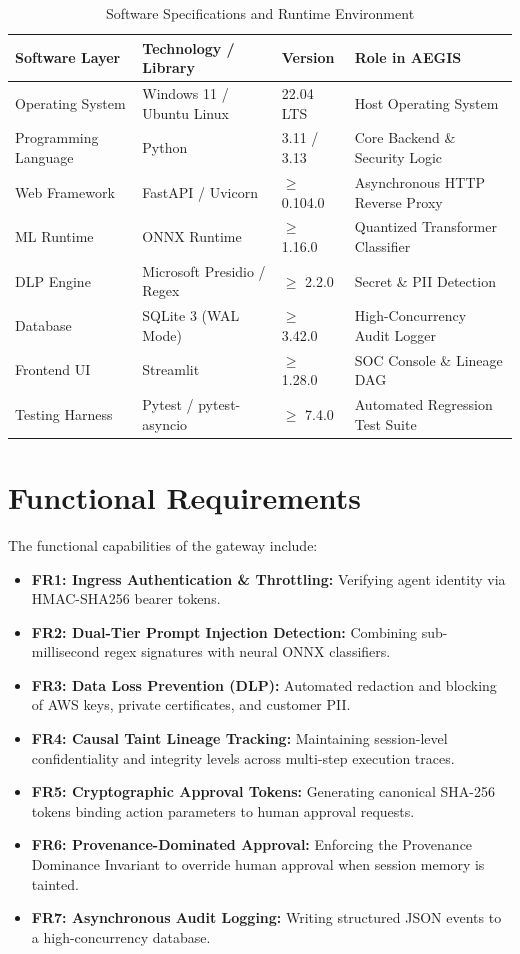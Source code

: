 \begin{table}[htbp]
\centering
\caption{Software Specifications and Runtime Environment}
\label{tab:software_specs}
\begin{tabular}{p{3.2cm} p{3.8cm} p{2.2cm} p{5.2cm}}
\toprule
\textbf{Software Layer} & \textbf{Technology / Library} & \textbf{Version} & \textbf{Role in AEGIS} \\
\midrule
Operating System & Windows 11 / Ubuntu Linux & 22.04 LTS & Host Operating System \\
Programming Language & Python & 3.11 / 3.13 & Core Backend \& Security Logic \\
Web Framework & FastAPI / Uvicorn & $\ge$ 0.104.0 & Asynchronous HTTP Reverse Proxy \\
ML Runtime & ONNX Runtime & $\ge$ 1.16.0 & Quantized Transformer Classifier \\
DLP Engine & Microsoft Presidio / Regex & $\ge$ 2.2.0 & Secret \& PII Detection \\
Database & SQLite 3 (WAL Mode) & $\ge$ 3.42.0 & High-Concurrency Audit Logger \\
Frontend UI & Streamlit & $\ge$ 1.28.0 & SOC Console \& Lineage DAG \\
Testing Harness & Pytest / pytest-asyncio & $\ge$ 7.4.0 & Automated Regression Test Suite \\
\bottomrule
\end{tabular}
\end{table}

\section{Functional Requirements}
The functional capabilities of the gateway include:
\begin{itemize}
    \item \textbf{FR1: Ingress Authentication \& Throttling:} Verifying agent identity via HMAC-SHA256 bearer tokens.
    \item \textbf{FR2: Dual-Tier Prompt Injection Detection:} Combining sub-millisecond regex signatures with neural ONNX classifiers.
    \item \textbf{FR3: Data Loss Prevention (DLP):} Automated redaction and blocking of AWS keys, private certificates, and customer PII.
    \item \textbf{FR4: Causal Taint Lineage Tracking:} Maintaining session-level confidentiality and integrity levels across multi-step execution traces.
    \item \textbf{FR5: Cryptographic Approval Tokens:} Generating canonical SHA-256 tokens binding action parameters to human approval requests.
    \item \textbf{FR6: Provenance-Dominated Approval:} Enforcing the Provenance Dominance Invariant to override human approval when session memory is tainted.
    \item \textbf{FR7: Asynchronous Audit Logging:} Writing structured JSON events to a high-concurrency database.
\end{itemize}

